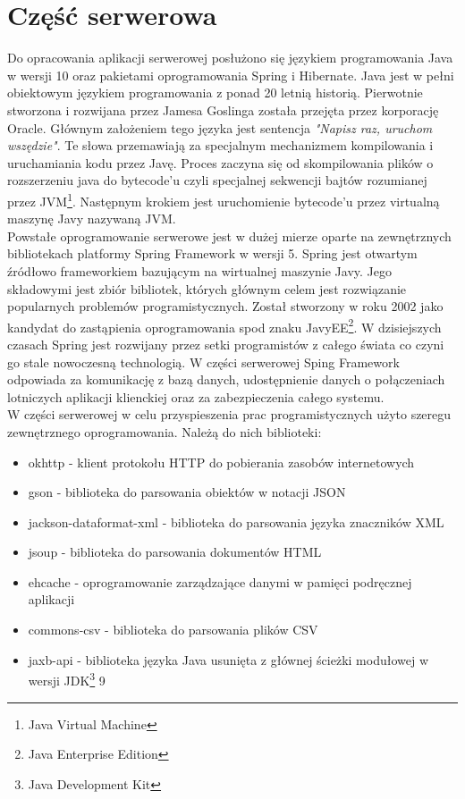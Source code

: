 \documentclass[12pt, twoside]{report}
\begin{document}
\section{Część serwerowa}
Do opracowania aplikacji serwerowej posłużono się językiem programowania Java w wersji 10 oraz pakietami oprogramowania Spring i Hibernate. Java jest w pełni obiektowym językiem programowania z ponad 20 letnią historią. Pierwotnie stworzona i rozwijana przez Jamesa Goslinga została przejęta przez korporację Oracle. Głównym założeniem tego języka jest sentencja \textit{"Napisz raz, uruchom wszędzie"}. Te słowa przemawiają za specjalnym mechanizmem kompilowania i uruchamiania kodu przez Javę. Proces zaczyna się od skompilowania plików o rozszerzeniu java do bytecode'u czyli specjalnej sekwencji bajtów rozumianej przez JVM\footnote{Java Virtual Machine}. Następnym krokiem jest uruchomienie bytecode'u przez virtualną maszynę Javy nazywaną JVM.\cite{jvm} \\ \indent
Powstałe oprogramowanie serwerowe jest w dużej mierze oparte na zewnętrznych bibliotekach platformy Spring Framework w wersji 5. Spring jest otwartym źródłowo frameworkiem bazującym na wirtualnej maszynie Javy. Jego składowymi jest zbiór bibliotek, których głównym celem jest rozwiązanie popularnych problemów programistycznych. Został stworzony w roku 2002 jako kandydat do zastąpienia oprogramowania spod znaku JavyEE\footnote{Java Enterprise Edition}. W dzisiejszych czasach Spring jest rozwijany przez setki programistów z całego świata co czyni go stale nowoczesną technologią. W części serwerowej Sping Framework odpowiada za komunikację z bazą danych, udostępnienie danych o połączeniach lotniczych aplikacji klienckiej oraz za zabezpieczenia całego systemu. \\ \indent
W części serwerowej w celu przyspieszenia prac programistycznych użyto szeregu zewnętrznego oprogramowania. Należą do nich biblioteki:
\begin{itemize}[noitemsep,topsep=0pt]
\item okhttp - klient protokołu HTTP do pobierania zasobów internetowych
\item gson - biblioteka do parsowania obiektów w notacji JSON
\item jackson-dataformat-xml - biblioteka do parsowania języka znaczników XML
\item jsoup - biblioteka do parsowania dokumentów HTML
\item ehcache - oprogramowanie zarządzające danymi w pamięci podręcznej aplikacji
\item commons-csv - biblioteka do parsowania plików CSV
\item jaxb-api - biblioteka języka Java usunięta z głównej ścieżki modułowej w wersji JDK\footnote{Java Development Kit} 9  
\end{itemize}
\end{document}
